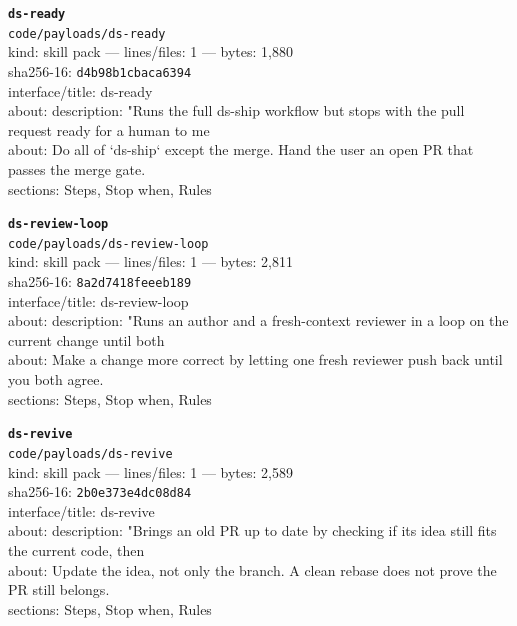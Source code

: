 \noindent\textbf{\texttt{ds-ready}}\\
\texttt{code/payloads/ds-ready}\\
kind: skill pack --- lines/files: 1 --- bytes: 1,880\\
sha256-16: \texttt{d4b98b1cbaca6394}\\
interface/title: ds-ready\\
about: description: "Runs the full ds-ship workflow but stops with the pull request ready for a human to me\\
about: Do all of `ds-ship` except the merge. Hand the user an open PR that passes the merge gate.\\
sections: Steps, Stop when, Rules\\
\vspace*{6.0pt}

\noindent\textbf{\texttt{ds-review-loop}}\\
\texttt{code/payloads/ds-review-loop}\\
kind: skill pack --- lines/files: 1 --- bytes: 2,811\\
sha256-16: \texttt{8a2d7418feeeb189}\\
interface/title: ds-review-loop\\
about: description: "Runs an author and a fresh-context reviewer in a loop on the current change until both\\
about: Make a change more correct by letting one fresh reviewer push back until you both agree.\\
sections: Steps, Stop when, Rules\\
\vspace*{6.0pt}

\noindent\textbf{\texttt{ds-revive}}\\
\texttt{code/payloads/ds-revive}\\
kind: skill pack --- lines/files: 1 --- bytes: 2,589\\
sha256-16: \texttt{2b0e373e4dc08d84}\\
interface/title: ds-revive\\
about: description: "Brings an old PR up to date by checking if its idea still fits the current code, then \\
about: Update the idea, not only the branch. A clean rebase does not prove the PR still belongs.\\
sections: Steps, Stop when, Rules\\
\vspace*{6.0pt}

